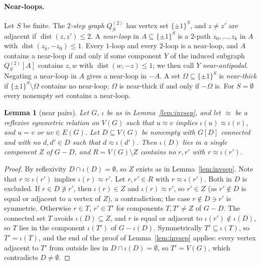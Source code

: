 \documentclass[11pt,letterpaper]{article}
\newtheorem{lemma}[theorem]{Lemma}
\theoremstyle{definition}
\newcommand{\cube}[1]{\{\pm1\}^{#1}}
\DeclareMathOperator{\dist}{dist}
\begin{document}
\paragraph{Near-loops.} Let $S$ be finite. The \emph{$2$-step graph} $Q^{(2)}_S$ has vertex set
$\cube S$, and $z\ne z'$ are adjacent if $\dist(z,z')\le2$. A \emph{near-loop} in $A\subseteq\cube S$ is a
$2$-path $z_0,\dots,z_k$ in $A$ with $\dist(z_k,-z_0)\le1$. Every $1$-loop and every $2$-loop is a
near-loop, and $A$ contains a near-loop if and only if some component $Y$ of the induced subgraph
$Q^{(2)}_S[A]$ contains $z,w$ with $\dist(w,-z)\le1$; we then call $Y$ \emph{near-antipodal}. Negating a
near-loop in $A$ gives a near-loop in $-A$. A set $\Omega\subseteq\cube S$ is \emph{near-thick} if
$\cube S\setminus\Omega$ contains no near-loop; $\Omega$ is near-thick if and only if $-\Omega$ is. For
$S=\emptyset$ every nonempty set contains a near-loop.

\begin{lemma}[near pairs]\label{lem:nearpairs}
Let $G$, $\iota$ be as in Lemma~\ref{lem:invsep}, and let $\approx$ be a reflexive symmetric relation
on $V(G)$ such that $u\approx v$ implies $\iota(u)\approx\iota(v)$, and $u=v$ or $uv\in E(G)$. Let
$D\subseteq V(G)$ be nonempty with $G[D]$ connected and with no $d,d'\in D$ such that
$d\approx\iota(d')$. Then $\iota(D)$ lies in a single component $Z$ of $G-D$, and $R=V(G)\setminus Z$
contains no $r,r'$ with $r\approx\iota(r')$.
\end{lemma}

\begin{proof}
By reflexivity $D\cap\iota(D)=\emptyset$, so $Z$ exists as in Lemma~\ref{lem:invsep}. Note that
$r\approx\iota(r')$ implies $\iota(r)\approx r'$. Let $r,r'\in R$ with $r\approx\iota(r')$. Both in $D$
is excluded. If $r\in D\not\ni r'$, then $\iota(r)\in Z$ and $\iota(r)\approx r'$, so $r'\in Z$ (as
$r'\notin D$ is equal or adjacent to a vertex of $Z$), a contradiction; the case $r\notin D\ni r'$ is
symmetric. Otherwise $r\in T$, $r'\in T'$ for components $T,T'\ne Z$ of $G-D$. The connected set $T$
avoids $\iota(D)\subseteq Z$, and $r$ is equal or adjacent to $\iota(r')\notin\iota(D)$, so $T$ lies in the
component $\iota(T')$ of $G-\iota(D)$. Symmetrically $T'\subseteq\iota(T)$, so $T'=\iota(T)$, and the
end of the proof of Lemma~\ref{lem:invsep} applies: every vertex adjacent to $T'$ from outside lies in
$D\cap\iota(D)=\emptyset$, so $T'=V(G)$, which contradicts $D\ne\emptyset$.
\end{proof}
\end{document}

